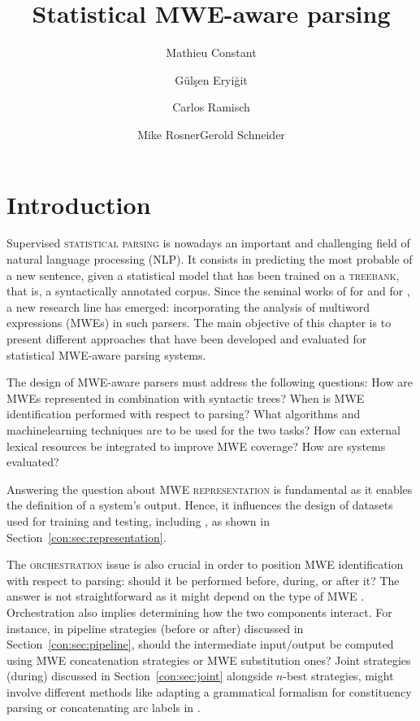 \documentclass[output=paper]{langsci/langscibook}
\title{Statistical MWE-aware parsing}
\author{Mathieu Constant\affiliation{ATILF UMR 7118, Université de Lorraine/CNRS}\and Gülşen Eryiğit\affiliation{Istanbul Technical University}\and Carlos Ramisch\affiliation{Aix-Marseille Université}\and Mike Rosner\affiliation{University of Malta}\lastand Gerold Schneider\affiliation{University of Konstanz and University of Zurich}}
\begin{document}
\maketitle

%
\section{Introduction}

Supervised \textsc{statistical parsing} is nowadays an important and challenging field of natural language processing (NLP). 
It consists in predicting the most probable  of a new sentence, given a statistical model that has been trained on a \textsc{treebank}, that is, a syntactically annotated corpus.
Since the seminal works of \citet{nivre04b} for  and \citet{arun05} for , a new research line has emerged: incorporating the analysis of multiword expressions (MWEs) in such parsers.
The main objective of this chapter is to present different approaches that have been developed and evaluated for statistical MWE-aware parsing systems. 


The design of MWE-aware parsers must address the following questions:
How are MWEs represented in combination with syntactic trees? 
When is MWE identification performed with respect to parsing? 
What algorithms and machine\linebreak learning techniques are to be used for the two tasks? 
How can external lexical resources be integrated to improve MWE coverage? 
How are systems evaluated?


Answering the question about MWE \textsc{representation} is fundamental as it enables the definition of a system's output. Hence, it influences the design of datasets used for training and testing, including , as shown in Section~\ref{con:sec:representation}.

The \textsc{orchestration} issue is also crucial in order to position MWE identification with respect to parsing: should it be performed before, during, or after it? The answer is not straightforward as it might depend on the type of MWE \citep{eryigit:2011:multiword}. Orchestration also implies determining how the two components interact. 
For instance, in pipeline strategies (before or after) discussed in Section~\ref{con:sec:pipeline}, should the intermediate input\slash output be computed using MWE concatenation strategies or MWE substitution ones? 
Joint strategies (during)  discussed in Section~\ref{con:sec:joint} alongside $n$-best strategies, might involve different methods like adapting a grammatical formalism for constituency parsing \citep{green13} or concatenating arc labels in  \citep{vincze13}.
\end{document}
